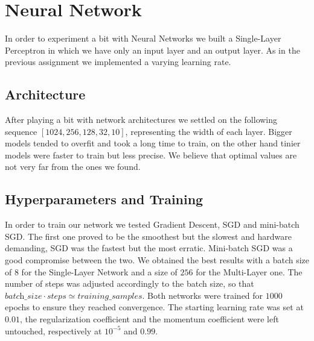 \documentclass[10pt,a4paper]{report}
\begin{document}
\section{Neural Network}
In order to experiment a bit with Neural Networks we built a Single-Layer Perceptron in which we have only an input layer and an output layer. As in the previous assignment we implemented a varying learning rate.
\subsection{Architecture}
After playing a bit with network architectures we settled on the following sequence $[1024, 256, 128, 32, 10]$, representing the width of each layer. Bigger models tended to overfit and took a long time to train, on the other hand tinier models were faster to train but less precise. We believe that optimal values are not very far from the ones we found.
\subsection{Hyperparameters and Training}
In order to train our network we tested Gradient Descent, SGD and mini-batch SGD. The first one proved to be the smoothest but the slowest and hardware demanding, SGD was the fastest but the most erratic. Mini-batch SGD was a good compromise between the two. We obtained the best results with a batch size of $8$ for the Single-Layer Network and a size of $256$ for the Multi-Layer one. The number of steps was adjusted accordingly to the batch size, so that $\textit{batch\_size} \cdot \textit{steps} \simeq \textit{training\_samples}$. Both networks were trained for $1000$ epochs to ensure they reached convergence. The starting learning rate was set at $0.01$, the regularization coefficient and the momentum coefficient were left untouched, respectively at $10^{-5}$ and $0.99$. 
\end{document}
